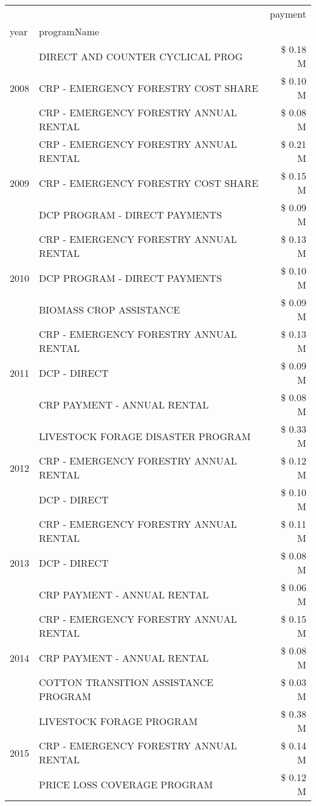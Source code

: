 \begin{tabular}{llr}
\toprule
 &  & payment \\
year & programName &  \\
\midrule
\multirow[t]{3}{*}{2008} & DIRECT AND COUNTER CYCLICAL PROG & \$ 0.18 M \\
 & CRP - EMERGENCY FORESTRY COST SHARE & \$ 0.10 M \\
 & CRP - EMERGENCY FORESTRY ANNUAL RENTAL & \$ 0.08 M \\
\cline{1-3}
\multirow[t]{3}{*}{2009} & CRP - EMERGENCY FORESTRY ANNUAL RENTAL & \$ 0.21 M \\
 & CRP - EMERGENCY FORESTRY COST SHARE & \$ 0.15 M \\
 & DCP PROGRAM - DIRECT PAYMENTS & \$ 0.09 M \\
\cline{1-3}
\multirow[t]{3}{*}{2010} & CRP - EMERGENCY FORESTRY ANNUAL RENTAL & \$ 0.13 M \\
 & DCP PROGRAM - DIRECT PAYMENTS & \$ 0.10 M \\
 & BIOMASS CROP ASSISTANCE & \$ 0.09 M \\
\cline{1-3}
\multirow[t]{3}{*}{2011} & CRP - EMERGENCY FORESTRY ANNUAL RENTAL & \$ 0.13 M \\
 & DCP - DIRECT & \$ 0.09 M \\
 & CRP PAYMENT - ANNUAL RENTAL & \$ 0.08 M \\
\cline{1-3}
\multirow[t]{3}{*}{2012} & LIVESTOCK FORAGE DISASTER PROGRAM & \$ 0.33 M \\
 & CRP - EMERGENCY FORESTRY ANNUAL RENTAL & \$ 0.12 M \\
 & DCP - DIRECT & \$ 0.10 M \\
\cline{1-3}
\multirow[t]{3}{*}{2013} & CRP - EMERGENCY FORESTRY ANNUAL RENTAL & \$ 0.11 M \\
 & DCP - DIRECT & \$ 0.08 M \\
 & CRP PAYMENT - ANNUAL RENTAL & \$ 0.06 M \\
\cline{1-3}
\multirow[t]{3}{*}{2014} & CRP - EMERGENCY FORESTRY ANNUAL RENTAL & \$ 0.15 M \\
 & CRP PAYMENT - ANNUAL RENTAL & \$ 0.08 M \\
 & COTTON TRANSITION ASSISTANCE PROGRAM & \$ 0.03 M \\
\cline{1-3}
\multirow[t]{3}{*}{2015} & LIVESTOCK FORAGE PROGRAM & \$ 0.38 M \\
 & CRP - EMERGENCY FORESTRY ANNUAL RENTAL & \$ 0.14 M \\
 & PRICE LOSS COVERAGE PROGRAM & \$ 0.12 M \\

\end{tabular}
